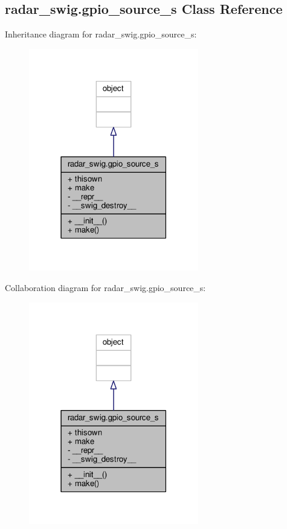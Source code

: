 \subsection{radar\+\_\+swig.\+gpio\+\_\+source\+\_\+s Class Reference}
\label{classradar__swig_1_1gpio__source__s}


Inheritance diagram for radar\+\_\+swig.\+gpio\+\_\+source\+\_\+s\+:
\nopagebreak
\begin{figure}[H]
\begin{center}
\leavevmode
\includegraphics[width=210pt]{d1/d82/classradar__swig_1_1gpio__source__s__inherit__graph}
\end{center}
\end{figure}


Collaboration diagram for radar\+\_\+swig.\+gpio\+\_\+source\+\_\+s\+:
\nopagebreak
\begin{figure}[H]
\begin{center}
\leavevmode
\includegraphics[width=210pt]{d2/de4/classradar__swig_1_1gpio__source__s__coll__graph}
\end{center}
\end{figure}
